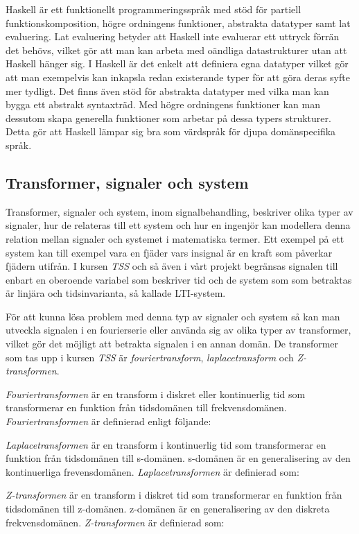 \documentclass[]{article}
\begin{document}
Haskell är ett funktionellt programmeringsspråk med stöd för partiell funktionskomposition,
högre ordningens funktioner, abstrakta datatyper samt lat evaluering.
Lat evaluering betyder att Haskell inte evaluerar ett uttryck förrän det behövs, vilket gör att man kan arbeta med oändliga datastrukturer utan att Haskell hänger sig.
I Haskell är det enkelt att definiera egna datatyper vilket gör att man exempelvis kan inkapsla redan existerande typer för att göra deras syfte mer tydligt. Det finns även stöd för abstrakta datatyper med vilka man kan bygga ett abstrakt syntaxträd. Med högre ordningens funktioner kan man dessutom skapa generella funktioner som arbetar på dessa typers strukturer. Detta gör att Haskell lämpar sig bra som värdspråk för djupa domänspecifika språk.

\subsection{Transformer, signaler och system}
Transformer, signaler och system, inom signalbehandling, beskriver olika typer av signaler, hur de relateras till ett
system och hur en ingenjör kan modellera denna relation mellan signaler och systemet i matematiska termer. Ett exempel
på ett system kan till exempel vara en fjäder vars insignal är en kraft som påverkar fjädern utifrån. I kursen
\textit{TSS} och så även i vårt projekt begränsas signalen till enbart en oberoende variabel som beskriver tid och de
system som som betraktas är linjära och tidsinvarianta, så kallade  LTI-system.

För att kunna lösa problem med denna typ av signaler och system så kan man utveckla signalen i en fourierserie eller
använda sig av olika typer av transformer, vilket gör det möjligt att betrakta signalen i en annan domän. De transformer
som tas upp i kursen \textit{TSS} är \textit{fouriertransform}, \textit{laplacetransform} och \textit{Z-transformen}.


\textit{Fouriertransformen} är en transform i diskret eller kontinuerlig tid som transformerar en funktion från
tidsdomänen till frekvensdomänen. \textit{Fouriertransformen} är definierad enligt följande:

\textit{Laplacetransformen} är en transform i kontinuerlig tid som transformerar en funktion från tidsdomänen till
s-domänen. s-domänen är en generalisering av den kontinuerliga frevensdomänen.  \textit{Laplacetransformen} är
definierad som:


\textit{Z-transformen} är en transform i diskret tid som transformerar en funktion från tidsdomänen till z-domänen.
z-domänen är en generalisering av den diskreta frekvensdomänen. \textit{Z-transformen} är definierad som:
\end{document}
